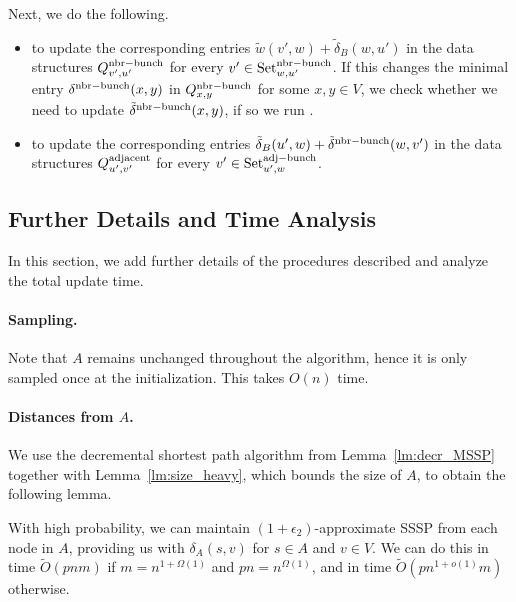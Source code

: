     Next, we do the following. 
    \begin{itemize}
        \item {} to update the corresponding entries $\tilde w(v',w)+\tilde\delta_B(w,u')$ in the data structures $Q^{\rm{nbr-bunch}}_{v',u'}$ for every $v'\in \text{Set}^{\rm{nbr-bunch}}_{w,u'}$. If this changes the minimal entry $\delta^{\rm{nbr-bunch}}(x,y)$ in $Q^{\rm{nbr-bunch}}_{x,y}$ for some $x,y\in V$, we check whether we need to update $\tilde \delta^{\rm{nbr-bunch}}(x,y)$, if so we run . %
        \item {} to update the corresponding entries $\tilde\delta_B(u',w)+\tilde\delta^{\rm{nbr-bunch}}(w,v')$ in the data structures $Q^{\rm{adjacent}}_{u',v'}$ for every $v'\in \text{Set}^{\rm{adj-bunch}}_{u',w}$.
    \end{itemize}


\subsection{Further Details and Time Analysis}\label{sc:mult_time}
In this section, we add further details of the procedures described and analyze the total update time. 

\paragraph{Sampling.} Note that $A$ remains unchanged throughout the algorithm, hence it is only sampled once at the initialization. This takes $O(n)$ time. 

\paragraph{Distances from $A$.} We use the decremental shortest path algorithm from Lemma~\ref{lm:decr_MSSP} together with Lemma~\ref{lm:size_heavy}, which bounds the size of $A$, to obtain the following lemma. 

\begin{lemma}\label{lm:A_MSSP}
    With high probability, we can maintain $(1+\epsilon_2)$-approximate SSSP from each node in $A$, providing us with $\delta_A(s,v)$ for $s\in A$ and $v\in V$. We can do this in time $\tilde{O}(pnm)$ if $m=n^{1+\Omega(1)}$ and $pn=n^{\Omega(1)}$, and in time $\tilde O(pn^{1+o(1)}m)$ otherwise.
\end{lemma}


